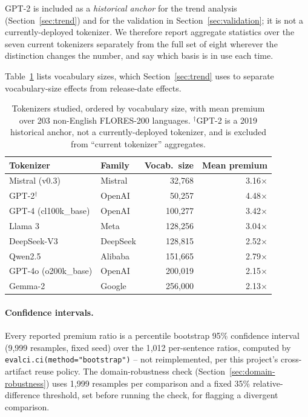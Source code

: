 \documentclass[11pt]{article}
\begin{document}
GPT-2 is included as a \emph{historical anchor} for the trend analysis
(Section~\ref{sec:trend}) and for the validation in
Section~\ref{sec:validation}; it is not a currently-deployed tokenizer. We
therefore report aggregate statistics over the seven current tokenizers
separately from the full set of eight wherever the distinction changes the
number, and say which basis is in use each time.

Table~\ref{tab:tokenizers} lists vocabulary sizes, which
Section~\ref{sec:trend} uses to separate vocabulary-size effects from
release-date effects.

\begin{table}[htbp]
\centering
\small
\begin{tabular}{llrr}
\toprule
Tokenizer & Family & Vocab.\ size & Mean premium \\
\midrule
Mistral (v0.3) & Mistral     & 32{,}768  & 3.16$\times$ \\
GPT-2$^\dagger$ & OpenAI     & 50{,}257  & 4.48$\times$ \\
GPT-4 (cl100k\_base) & OpenAI & 100{,}277 & 3.42$\times$ \\
Llama 3        & Meta        & 128{,}256 & 3.04$\times$ \\
DeepSeek-V3    & DeepSeek    & 128{,}815 & 2.52$\times$ \\
Qwen2.5        & Alibaba     & 151{,}665 & 2.79$\times$ \\
GPT-4o (o200k\_base) & OpenAI & 200{,}019 & 2.15$\times$ \\
Gemma-2        & Google      & 256{,}000 & 2.13$\times$ \\
\bottomrule
\end{tabular}
\caption{Tokenizers studied, ordered by vocabulary size, with mean premium
over 203 non-English FLORES-200 languages. $^\dagger$GPT-2 is a 2019
historical anchor, not a currently-deployed tokenizer, and is excluded from
``current tokenizer'' aggregates.}
\label{tab:tokenizers}
\end{table}

\paragraph{Confidence intervals.} Every reported premium ratio is a
percentile bootstrap 95\% confidence interval (9{,}999 resamples, fixed
seed) over the 1{,}012 per-sentence ratios, computed by
\texttt{evalci.ci(method="bootstrap")} \citep{chandrahas2026evalci} -- not
reimplemented, per this project's cross-artifact reuse policy. The
domain-robustness check (Section~\ref{sec:domain-robustness}) uses 1{,}999
resamples per comparison and a fixed 35\% relative-difference threshold,
set before running the check, for flagging a divergent comparison.
\end{document}
